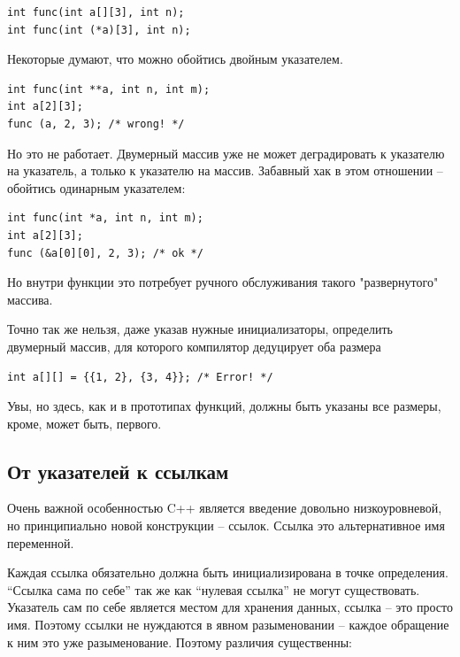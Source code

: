 \documentclass[a4paper,12pt,oneside]{article}
\begin{document}
\begin{lstlisting}
int func(int a[][3], int n);
int func(int (*a)[3], int n);
\end{lstlisting}

Некоторые думают, что можно обойтись двойным указателем.

\begin{lstlisting}
int func(int **a, int n, int m);
int a[2][3];
func (a, 2, 3); /* wrong! */
\end{lstlisting}

Но это не работает. Двумерный массив уже не может деградировать к указателю на указатель, а только к указателю на массив. Забавный хак в этом отношении -- обойтись одинарным указателем:

\begin{lstlisting}
int func(int *a, int n, int m);
int a[2][3];
func (&a[0][0], 2, 3); /* ok */
\end{lstlisting}

Но внутри функции это потребует ручного обслуживания такого "развернутого" массива.

Точно так же нельзя, даже указав нужные инициализаторы, определить двумерный массив, для которого компилятор дедуцирует оба размера

\begin{lstlisting}
int a[][] = {{1, 2}, {3, 4}}; /* Error! */
\end{lstlisting}

Увы, но здесь, как и в прототипах функций, должны быть указаны все размеры, кроме, может быть, первого.

\subsection{От указателей к ссылкам}\label{PointersAndRefs}

Очень важной особенностью C++ является введение довольно низкоуровневой, но принципиально новой конструкции – ссылок. Ссылка это альтернативное имя переменной.



Каждая ссылка обязательно должна быть инициализирована в точке определения. ``Ссылка сама по себе'' так же как ``нулевая ссылка'' не могут существовать. Указатель сам по себе является местом для хранения данных, ссылка – это просто имя. Поэтому ссылки не нуждаются в явном разыменовании – каждое обращение к ним это уже разыменование. Поэтому различия существенны:
\end{document}
